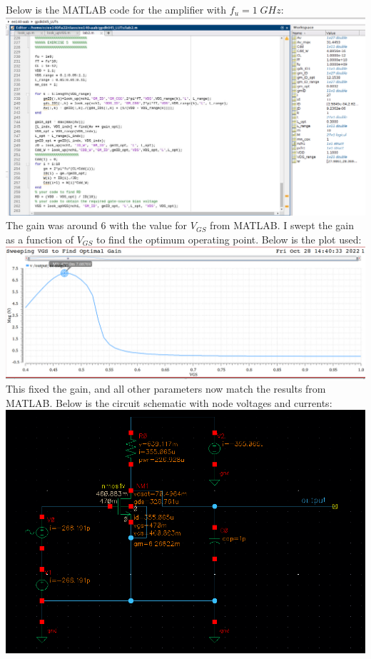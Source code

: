 \documentclass[12pt, fleqn]{article}
\begin{document}
\newpage
Below is the MATLAB code for the amplifier with $f_u = 1\;GHz$:\\[0.25cm]
\includegraphics[scale=0.375, center]{mat_res9.PNG}\\[0.25cm]
\newpage
The gain was around 6 with the value for $V_{GS}$ from MATLAB.  I swept the gain as a function of $V_{GS}$ to find the optimum operating point.  Below is the plot used:\\[0.25cm]
\includegraphics[scale=0.275, center]{opt_vgs.PNG}\\[0.25cm]
This fixed the gain, and all other parameters now match the results from MATLAB.  Below is the circuit schematic with node voltages and currents:\\[0.25cm]
\includegraphics[scale=0.35, center]{schem7.PNG}\\[0.25cm]
\end{document}
